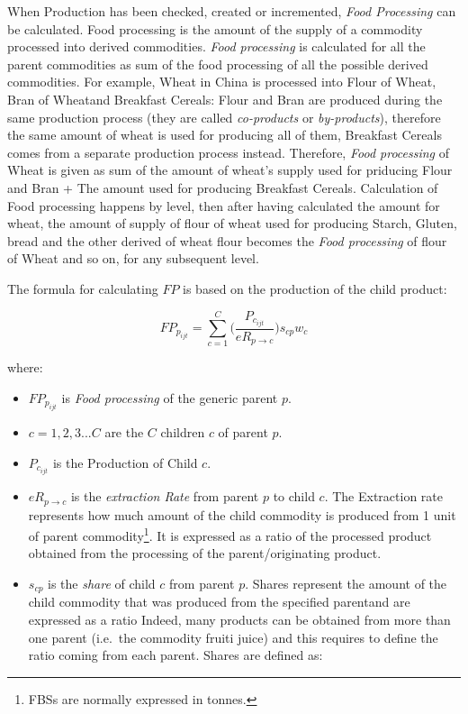 \documentclass[]{article}
\providecommand{\tightlist}{%
  \setlength{\itemsep}{0pt}\setlength{\parskip}{0pt}}
\let\rmarkdownfootnote\footnote%
\def\footnote{\protect\rmarkdownfootnote}
\begin{document}
When Production has been checked, created or incremented, \emph{Food
Processing} can be calculated. Food processing is the amount of the
supply of a commodity processed into derived commodities. \emph{Food
processing} is calculated for all the parent commodities as sum of the
food processing of all the possible derived commodities. For example,
Wheat in China is processed into Flour of Wheat, Bran of Wheatand
Breakfast Cereals: Flour and Bran are produced during the same
production process (they are called \emph{co-products} or
\emph{by-products}), therefore the same amount of wheat is used for
producing all of them, Breakfast Cereals comes from a separate
production process instead. Therefore, \emph{Food processing} of Wheat
is given as sum of the amount of wheat's supply used for priducing Flour
and Bran + The amount used for producing Breakfast Cereals. Calculation
of Food processing happens by level, then after having calculated the
amount for wheat, the amount of supply of flour of wheat used for
producing Starch, Gluten, bread and the other derived of wheat flour
becomes the \emph{Food processing} of flour of Wheat and so on, for any
subsequent level.

The formula for calculating \(FP\) is based on the production of the
child product:

\begin{equation}
\label{Food Processing}
FP_{p_{ijt}} = \sum \limits_{c=1}^C\biggl(\frac{P_{c_{ijt}}}{eR_{p\to c}}\biggr)s_{cp}w_{c}
\end{equation}

where:

\begin{itemize}
\tightlist
\item
  \(FP_{p_{ijt}}\) is \emph{Food processing} of the generic parent
  \(p\).
\item
  \(c = 1,2,3...C\) are the \(C\) children \(c\) of parent \(p\).
\item
  \(P_{c_{ijt}}\) is the Production of Child \(c\).
\item
  \(eR_{p\to c}\) is the \emph{extraction Rate} from parent \(p\) to
  child \(c\). The Extraction rate represents how much amount of the
  child commodity is produced from 1 unit of parent commodity\footnote{FBSs
    are normally expressed in tonnes.}. It is expressed as a ratio of
  the processed product obtained from the processing of the
  parent/originating product.
\item
  \(s_{cp}\) is the \emph{share} of child \(c\) from parent \(p\).
  Shares represent the amount of the child commodity that was produced
  from the specified parentand are expressed as a ratio Indeed, many
  products can be obtained from more than one parent (i.e.~the commodity
  fruiti juice) and this requires to define the ratio coming from each
  parent. Shares are defined as:
\end{itemize}
\end{document}

